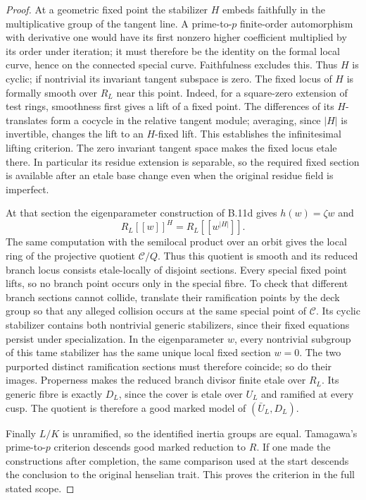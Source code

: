 \begin{proof}
At a geometric fixed point the stabilizer $H$ embeds faithfully in
the multiplicative group of the tangent line. A prime-to-$p$
finite-order automorphism with derivative one would have its first
nonzero higher coefficient multiplied by its order under iteration;
it must therefore be the identity on the formal local curve, hence
on the connected special curve. Faithfulness excludes this. Thus
$H$ is cyclic; if nontrivial its invariant tangent subspace is zero.
The fixed locus of $H$ is formally smooth over $R_L$ near this point.
Indeed, for a square-zero extension of test rings, smoothness first
gives a lift of a fixed point. The differences of its $H$-translates
form a cocycle in the relative tangent module; averaging, since
$|H|$ is invertible, changes the lift to an $H$-fixed lift. This
establishes the infinitesimal lifting criterion. The zero invariant
tangent space makes the fixed locus etale there. In particular its
residue extension is separable, so the required fixed section is
available after an etale base change even when the original residue
field is imperfect.

At that section the eigenparameter construction of B.11d gives
$h(w)=\zeta w$ and
\[
                       R_L[[w]]^H=R_L[[w^{|H|}]].
\]
The same computation with the semilocal product over an orbit gives
the local ring of the projective quotient $\mathcal C/Q$.
Thus this quotient is smooth and its reduced branch locus consists
etale-locally of disjoint sections. Every special fixed point lifts,
so no branch point occurs only in the special fibre. To check that
different branch sections cannot collide, translate their ramification
points by the deck group so that any alleged collision occurs at the
same special point of $\mathcal C$. Its cyclic stabilizer contains
both nontrivial generic stabilizers, since their fixed equations
persist under specialization. In the eigenparameter $w$, every
nontrivial subgroup of this tame stabilizer has the same unique
local fixed section $w=0$. The two purported distinct ramification
sections must therefore coincide; so do their images. Properness makes
the reduced branch divisor finite etale over $R_L$.
Its generic fibre is exactly $D_L$, since the cover is etale over
$U_L$ and ramified at every cusp. The quotient is therefore a good
marked model of $(\bar U_L,D_L)$.

Finally $L/K$ is unramified, so the identified inertia groups are
equal. Tamagawa's prime-to-$p$ criterion descends good marked
reduction to $R$. If one made the constructions after completion,
the same comparison used at the start descends the conclusion to
the original henselian trait. This proves the criterion in the
full stated scope.
\end{proof}
